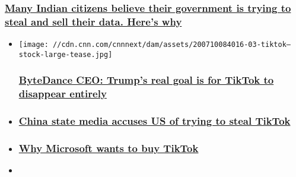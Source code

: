 \begin{itemize}
{  \subsubsection{\texorpdfstring{\href{/2020/06/21/tech/india-privacy-app-hnk-intl/index.html}{Many
  Indian citizens believe their government is trying to steal and sell
  their data. Here's
  why}}{Many Indian citizens believe their government is trying to steal and sell their data. Here's why}}\label{many-indian-citizens-believe-their-government-is-trying-to-steal-and-sell-their-data-heres-why}}
\end{itemize}

\begin{itemize}
\item
  \href{/2020/08/04/tech/tiktok-trump-ban-bytedance/index.html}{}

  \texttt{[image: //cdn.cnn.com/cnnnext/dam/assets/200710084016-03-tiktok---stock-large-tease.jpg]}

  \hypertarget{bytedance-ceo-trumps-real-goal-is-for-tiktok-to-disappear-entirely}{%
  \subsubsection{\texorpdfstring{\href{/2020/08/04/tech/tiktok-trump-ban-bytedance/index.html}{ByteDance
  CEO: Trump's real goal is for TikTok to disappear
  entirely}}{ByteDance CEO: Trump's real goal is for TikTok to disappear entirely}}\label{bytedance-ceo-trumps-real-goal-is-for-tiktok-to-disappear-entirely}}
\item
  \hypertarget{china-state-media-accuses-us-of-trying-to-steal-tiktok}{%
  \subsubsection{\texorpdfstring{\href{/2020/08/04/tech/tiktok-chinese-media-intl-hnk/index.html}{China
  state media accuses US of trying to steal
  TikTok}}{China state media accuses US of trying to steal TikTok}}\label{china-state-media-accuses-us-of-trying-to-steal-tiktok}}
\item
  \hypertarget{why-microsoft-wants-to-buy-tiktok}{%
  \subsubsection{\texorpdfstring{\href{/2020/08/03/tech/microsoft-tiktok-acquisition/index.html}{Why
  Microsoft wants to buy
  TikTok}}{Why Microsoft wants to buy TikTok}}\label{why-microsoft-wants-to-buy-tiktok}}
\item
  \hypertarget{how-tiktok-users-are-reacting-to-trumps-possible-us-ban}{%
}
\end{itemize}
